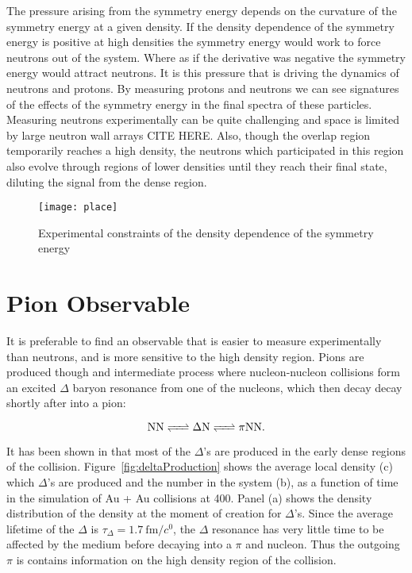 The pressure arising from the symmetry energy depends on the curvature of the symmetry energy at a given density. If the density dependence of the symmetry energy is positive at high densities the symmetry energy would work to force neutrons out of the system. Where as if the derivative was negative the symmetry energy would attract neutrons. It is this pressure that is driving the dynamics of neutrons and protons. By measuring protons and neutrons we can see signatures of the effects of the symmetry energy in the final spectra of these particles. Measuring neutrons experimentally can be quite challenging and space is limited by large neutron wall arrays CITE HERE. Also, though the overlap region temporarily reaches a high density, the neutrons which participated in this region also evolve through regions of lower densities until they reach their final state, diluting the signal from the dense region. 


\begin{figure}
\centering
\texttt{[image: place]}
\caption{Experimental constraints of the density dependence of the symmetry energy}
\label{fig:symDen}
\end{figure}


\section{Pion Observable}
It is preferable to find an observable that is easier to measure experimentally than neutrons, and is more sensitive to the high density region. Pions are produced though and intermediate process where nucleon-nucleon collisions form an excited $\Delta$ baryon resonance from one of the nucleons, which then decay decay shortly after into a pion:

\begin{equation}
\ce{ NN <=> \Delta N <=> \pi NN}.
\end{equation}


It has been shown in \cite{mingzhang} that most of the $\Delta$'s are produced in the early dense regions of the collision. Figure~\ref{fig:deltaProduction} shows the average local density (c) which $\Delta$'s are produced and the number in the system (b), as a function of time in the simulation of Au + Au collisions at \SI{400}{\MeVA}. Panel (a) shows the density distribution of the density at the moment of creation for $\Delta$'s. Since the average lifetime of the $\Delta$  is $\tau_{\Delta} = \SI{1.7}{\femto\metre\per\clight}$, the $\Delta$ resonance has very little time to be affected by the medium before decaying into a $\pi$ and nucleon. Thus the outgoing $\pi$ is contains information on the high density region of the collision. 

